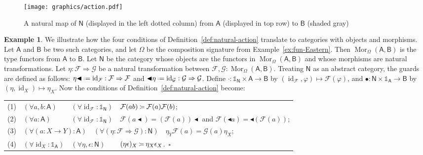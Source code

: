 \documentclass{amsart}
\newcommand{\tin}{:}
\newcommand{\Cat}[1]{\mathsf{#1}}
\newcommand{\cat}[1]{\Cat{#1}}
\newcommand{\acat}[1]{\mathsf{#1}}
\numberwithin{lstfloat}{section}
\DeclareMathOperator{\id}{id}
\DeclareMathOperator{\ftor}{Mor}
\newcommand{\srcfunc}{\mathbin{\blacktriangleleft}}
\newcommand{\tgtfunc}{\mathbin{\blacktriangleleft}}
\newcommand{\src}[1]{#1\srcfunc}
\newcommand{\tgt}[1]{\tgtfunc #1}
\newcommand{\one}{\mathbb{1}}
\newcommand{\defeq}{\mathrel{\hstretch{.13}{=}\hspace{.2ex}{=}}}
\newcommand{\func}[1]{\mathcal{#1}}
\newcommand{\venturi}{%
  \mathrel{
    \begin{tikzpicture}[yscale=0.6,xscale=0.5]
        \draw (0ex,2.5ex) to (1ex,2ex);
        \draw (1ex,2ex) to (3ex,2ex);
        \draw (0ex,0.75ex) to (1ex,1.25ex);
        \draw (1ex,1.25ex) to (3ex,1.25ex);
    \end{tikzpicture}
  }
}
\newcommand{\exqed}{\hfill $\square$}
\theoremstyle{definition}
\newtheorem{ex}[thm]{Example}
\theoremstyle{remark}
\numberwithin{equation}{section}
\begin{document}
\begin{figure}[!htbp]
  \centering
  \texttt{[image: graphics/action.pdf]} 
  \caption{A natural map of $\cat{N}$ (displayed in the left dotted column) from
  $\cat{A}$ (displayed in top row) to $\cat{B}$ (shaded gray)}
  \label{fig:functor-cat-act}
\end{figure}

\begin{ex}\label{ex:natural-maps} We illustrate how the four conditions of
Definition~\ref{def:natural-action} translate to categories with objects and
morphisms. Let $\acat{A}$ and $\acat{B}$ be two such categories, and let
$\Omega$ be the composition signature from Example~\ref{ex:fun-Eastern}. Then
$\ftor_{\Omega}(\acat{A},\acat{B})$ is the type {functors} from $\acat{A}$ to
$\acat{B}$. Let $\acat{N}$ be the category whose objects are the {functors} in
$\ftor_{\Omega}(\acat{A},\acat{B})$ and whose morphisms are natural
transformations. Let $\eta : \func{F} \Rightarrow \func{G}$ be a natural
transformation between $\func{F},\func{G}\tin
\ftor_{\Omega}(\acat{A},\acat{B})$. Treating $\acat{N}$ as an abstract category,
the guards are defined as follows: $\src{\eta} \defeq \id_{\func{F}}: \func{F}
\Rightarrow \func{F}$ and $\tgt{\eta} \defeq \id_{\func{G}} :
\func{G}\Rightarrow \func{G}$. Define $\cdot : \one_{\acat{N}}\times \acat{A}
\to \acat{B}$ by  $(\id_{\func{F}}, \varphi) \longmapsto \func{F}(\varphi)$,
  and  $\bullet : \acat{N} \times \one_{\acat{A}} \to \acat{B}$ by
    $(\eta, \id_X) \longmapsto \eta_X$. Now the  conditions of
    Definition~\ref{def:natural-action} become: \\[1.5ex]
  \hspace*{0.5cm}\begin{tabular}{llll}
   (1) & $(\forall a,b \tin \acat{A})$ & $(\forall \id_{\func{F}}\tin \one_{\acat{N}})$ & $\func{F}(ab) \venturi \func{F}(a)\func{F}(b)$;\\[0.7ex]
  (2) & $(\forall a \tin \acat{A})$ & $(\forall \id_{\func{F}}\tin \one_{\acat{N}})$ & $\func{F}(\src{a}) = \src{(\func{F}(a))}$ and  $\func{F}(\tgt{a}) = \tgt{(\func{F}(a))}$;\\[0.7ex]
   (3) & \multicolumn{3}{l}{$(\forall (a:X\to Y) \tin \acat{A})\quad (\forall (\eta : \func{F}\Rightarrow \func{G})\tin\acat{N})\quad \eta_Y\func{F}(a) = \func{G}(a)\eta_X$;}\\[0.7ex]
   (4) & $(\forall \id_X\tin\one_{\acat{A}})$ & $(\forall \eta,\epsilon
    \tin\acat{N})$ & $(\eta\epsilon)_X \venturi \eta_X\epsilon_X$.~\exqed
  \end{tabular}
\end{ex} 
\end{document}
